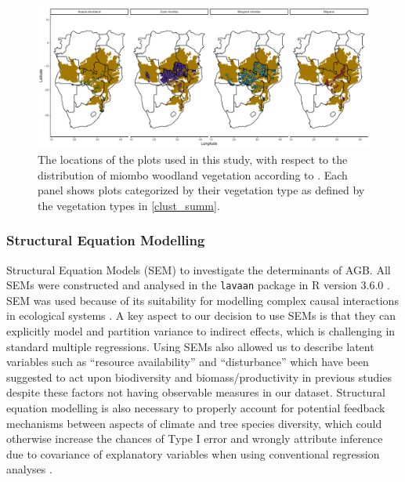 \documentclass[11pt,a4paper]{article}
\begin{document}
\begin{landscape}


\begin{figure}[H]
\centering
	\includegraphics[width=1.4\textwidth]{clust_map}
	\caption{The locations of the \nplots{} plots used in this study, with respect to the distribution of miombo woodland vegetation according to \citet{White1987}. Each panel shows plots categorized by their vegetation type as defined by the vegetation types in \autoref{clust_summ}.}
	\label{clust_map}
\end{figure}
\end{landscape}

\subsubsection{Structural Equation Modelling}

 Structural Equation Models (SEM) to investigate the determinants of AGB. All SEMs were constructed and analysed in the \verb|lavaan| package \citep{lavaan} in R version 3.6.0 \citep{R2019}. SEM was used because of its suitability for modelling complex causal interactions in ecological systems \citep{Lee2007}. A key aspect to our decision to use SEMs is that they can explicitly model and partition variance  to indirect effects, which is challenging in standard multiple regressions. Using SEMs also allowed us to describe latent variables such as ``resource availability'' and ``disturbance'' which have been suggested to act upon biodiversity and biomass/productivity in previous studies despite these factors not having observable measures in our dataset. Structural equation modelling is also necessary to properly account for potential feedback mechanisms between aspects of climate and tree species diversity, which could otherwise increase the chances of Type I error and wrongly attribute inference due to covariance of explanatory variables when using conventional regression analyses \citep{Nachtigall2003}.
\end{document}
